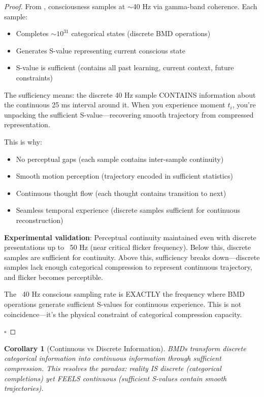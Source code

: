 \documentclass[12pt,a4paper]{article}
\newtheorem{corollary}[theorem]{Corollary}
\begin{document}
\begin{proof}
From \cite{sachikonye2024consciousness}, consciousness samples at $\sim$40 Hz via gamma-band coherence. Each sample:

\begin{itemize}
\item Completes $\sim 10^{31}$ categorical states (discrete BMD operations)
\item Generates S-value representing current conscious state
\item S-value is sufficient (contains all past learning, current context, future constraints)
\end{itemize}

The sufficiency means: the discrete 40 Hz sample CONTAINS information about the continuous 25 ms interval around it. When you experience moment $t_i$, you're unpacking the sufficient S-value—recovering smooth trajectory from compressed representation.

This is why:
\begin{itemize}
\item No perceptual gaps (each sample contains inter-sample continuity)
\item Smooth motion perception (trajectory encoded in sufficient statistics)
\item Continuous thought flow (each thought contains transition to next)
\item Seamless temporal experience (discrete samples sufficient for continuous reconstruction)
\end{itemize}

\textbf{Experimental validation}: Perceptual continuity maintained even with discrete presentations up to ~50 Hz (near critical flicker frequency). Below this, discrete samples are sufficient for continuity. Above this, sufficiency breaks down—discrete samples lack enough categorical compression to represent continuous trajectory, and flicker becomes perceptible.

The ~40 Hz conscious sampling rate is EXACTLY the frequency where BMD operations generate sufficient S-values for continuous experience. This is not coincidence—it's the physical constraint of categorical compression capacity.

$\square$
\end{proof}

\begin{corollary}[Continuous vs Discrete Information]
BMDs transform discrete categorical information into continuous information through sufficient compression. This resolves the paradox: reality IS discrete (categorical completions) yet FEELS continuous (sufficient S-values contain smooth trajectories).
\end{corollary}
\end{document}
